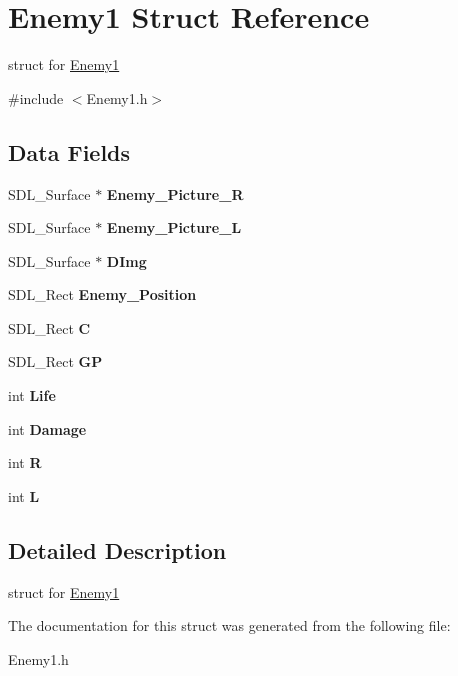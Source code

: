\hypertarget{structEnemy1}{}\section{Enemy1 Struct Reference}
\label{structEnemy1}


struct for \hyperlink{structEnemy1}{Enemy1}  




{\ttfamily \#include $<$Enemy1.\+h$>$}

\subsection*{Data Fields}
\begin{DoxyCompactItemize}
\item 
\mbox{\label{structEnemy1_a1d6f04def6bfd4bdf9076e5431fba6fa}} 
S\+D\+L\+\_\+\+Surface $\ast$ {\bfseries Enemy\+\_\+\+Picture\+\_\+R}
\item 
\mbox{\label{structEnemy1_a383eb70db8566cfaee5b9ae02e7f6365}} 
S\+D\+L\+\_\+\+Surface $\ast$ {\bfseries Enemy\+\_\+\+Picture\+\_\+L}
\item 
\mbox{\label{structEnemy1_a5416597214537fe66b14dbccf7139bba}} 
S\+D\+L\+\_\+\+Surface $\ast$ {\bfseries D\+Img}
\item 
\mbox{\label{structEnemy1_a4236d4bfc29e2380381a267e61dc41d6}} 
S\+D\+L\+\_\+\+Rect {\bfseries Enemy\+\_\+\+Position}
\item 
\mbox{\label{structEnemy1_a977569b4dfc0b43b3eb763c4d819ba0f}} 
S\+D\+L\+\_\+\+Rect {\bfseries C}
\item 
\mbox{\label{structEnemy1_ab4b145352d33f54ecb06d4101f44ebf8}} 
S\+D\+L\+\_\+\+Rect {\bfseries GP}
\item 
\mbox{\label{structEnemy1_a5f9b227bcc1aa7ba77a098975f5c3de0}} 
int {\bfseries Life}
\item 
\mbox{\label{structEnemy1_a612962b22c32b0934a1c4ac68c8aa8b6}} 
int {\bfseries Damage}
\item 
\mbox{\label{structEnemy1_a22e3f5203e81be61a301b4705975fe0d}} 
int {\bfseries R}
\item 
\mbox{\label{structEnemy1_ad798ed830001779ba95001d4d59f56a7}} 
int {\bfseries L}
\end{DoxyCompactItemize}


\subsection{Detailed Description}
struct for \hyperlink{structEnemy1}{Enemy1} 

The documentation for this struct was generated from the following file\+:\begin{DoxyCompactItemize}
\item 
Enemy1.\+h\end{DoxyCompactItemize}

